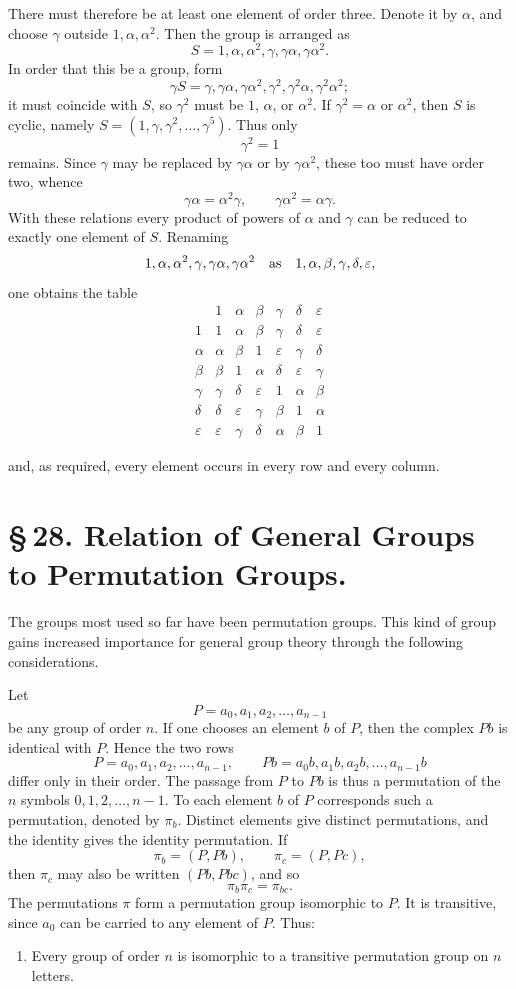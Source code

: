 \documentclass[11pt]{article}
\newcommand{\orderSixTable}{%
\[
\begin{array}{c|cccccc}
&1&\alpha&\beta&\gamma&\delta&\varepsilon\\\hline
1&1&\alpha&\beta&\gamma&\delta&\varepsilon\\
\alpha&\alpha&\beta&1&\varepsilon&\gamma&\delta\\
\beta&\beta&1&\alpha&\delta&\varepsilon&\gamma\\
\gamma&\gamma&\delta&\varepsilon&1&\alpha&\beta\\
\delta&\delta&\varepsilon&\gamma&\beta&1&\alpha\\
\varepsilon&\varepsilon&\gamma&\delta&\alpha&\beta&1
\end{array}
\]
}
\begin{document}
There must therefore be at least one element of order three. Denote it by $\alpha$, and choose $\gamma$ outside $1,\alpha,\alpha^2$. Then the group is arranged as
\begin{equation}
S=1,\alpha,\alpha^2,\gamma,\gamma\alpha,\gamma\alpha^2.
\tag{1}
\end{equation}
In order that this be a group, form
\[
\gamma S=\gamma,\gamma\alpha,\gamma\alpha^2,\gamma^2,\gamma^2\alpha,\gamma^2\alpha^2;
\]
it must coincide with $S$, so $\gamma^2$ must be $1$, $\alpha$, or $\alpha^2$. If $\gamma^2=\alpha$ or $\alpha^2$, then $S$ is cyclic, namely $S=(1,\gamma,\gamma^2,\ldots,\gamma^5)$. Thus only
\begin{equation}
\gamma^2=1
\tag{2}
\end{equation}
remains. Since $\gamma$ may be replaced by $\gamma\alpha$ or by $\gamma\alpha^2$, these too must have order two, whence
\begin{equation}
\gamma\alpha=\alpha^2\gamma,
\qquad
\gamma\alpha^2=\alpha\gamma.
\tag{3}
\end{equation}
With these relations every product of powers of $\alpha$ and $\gamma$ can be reduced to exactly one element of $S$. Renaming
\[
1,\alpha,\alpha^2,\gamma,\gamma\alpha,\gamma\alpha^2
\quad\hbox{as}\quad
1,\alpha,\beta,\gamma,\delta,\varepsilon,
\]
one obtains the table
\orderSixTable
and, as required, every element occurs in every row and every column.

\section*{\S\,28. Relation of General Groups to Permutation Groups.}

The groups most used so far have been permutation groups. This kind of group gains increased importance for general group theory through the following considerations.

Let
\begin{equation}
P=a_0,a_1,a_2,\ldots,a_{n-1}
\tag{1}
\end{equation}
be any group of order $n$. If one chooses an element $b$ of $P$, then the complex $Pb$ is identical with $P$. Hence the two rows
\[
P=a_0,a_1,a_2,\ldots,a_{n-1},
\qquad
Pb=a_0b,a_1b,a_2b,\ldots,a_{n-1}b
\]
differ only in their order. The passage from $P$ to $Pb$ is thus a permutation of the $n$ symbols $0,1,2,
\ldots,n-1$. To each element $b$ of $P$ corresponds such a permutation, denoted by $\pi_b$. Distinct elements give distinct permutations, and the identity gives the identity permutation. If
\[
\pi_b=(P,Pb),\qquad \pi_c=(P,Pc),
\]
then $\pi_c$ may also be written $(Pb,Pbc)$, and so
\begin{equation}
\pi_b\pi_c=\pi_{bc}.
\tag{2}
\end{equation}
The permutations $\pi$ form a permutation group isomorphic to $P$. It is transitive, since $a_0$ can be carried to any element of $P$. Thus:
\begin{enumerate}[label=\arabic*.,leftmargin=2.2em]
\item Every group of order $n$ is isomorphic to a transitive permutation group on $n$ letters.
\end{enumerate}
\end{document}
